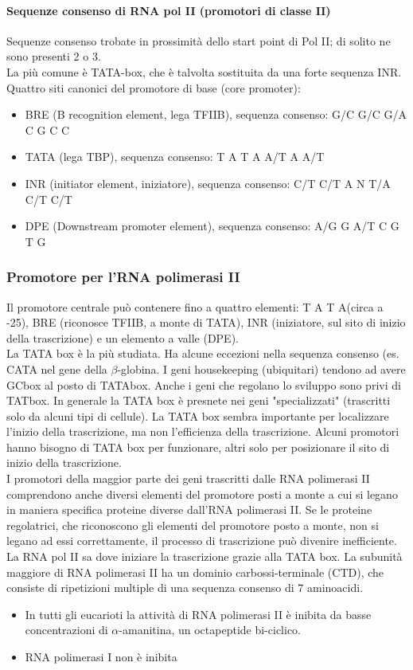 \documentclass{article}
\begin{document}
\paragraph{Sequenze consenso di RNA pol II (promotori di classe II)}
Sequenze consenso trobate in prossimità dello start point di Pol II; di solito ne sono presenti 2 o 3.\\
La più comune è TATA-box, che è talvolta sostituita da una forte sequenza INR.\\
Quattro siti canonici del promotore di base (core promoter):
\begin{itemize}
    \item BRE (B recognition element, lega TFIIB), sequenza consenso: G/C G/C G/A C G C C 
    \item TATA (lega TBP), sequenza consenso: T A T A A/T A A/T
    \item INR (initiator element, iniziatore), sequenza consenso: C/T C/T A N T/A C/T C/T
    \item DPE (Downstream promoter element), sequenza consenso: A/G G A/T C G T G
\end{itemize}
\subsubsection{Promotore per l'RNA polimerasi II}
Il promotore centrale può contenere fino a quattro elementi: T A T A(circa a -25), BRE (riconosce TFIIB, a monte di TATA), INR (iniziatore, sul sito di inizio della trascrizione) e un elemento a valle (DPE).\\
La TATA box è la più studiata. Ha alcune eccezioni nella sequenza consenso (es. CATA nel gene della $\beta$-globina. I geni housekeeping (ubiquitari) tendono ad avere GCbox al posto di TATAbox. Anche i geni che regolano lo sviluppo sono privi di TATbox.
In generale la TATA box è presnete nei geni "specializzati" (trascritti solo da alcuni tipi di cellule). La TATA box sembra importante per localizzare l'inizio della trascrizione, ma non l'efficienza della trascrizione.
Alcuni promotori hanno bisogno di TATA box per funzionare, altri solo per posizionare il sito di inizio della trascrizione.\\
I promotori della maggior parte dei geni trascritti dalle RNA polimerasi II comprendono anche diversi elementi del promotore posti a monte a cui si legano in maniera specifica proteine diverse dall'RNA polimerasi II.
Se le proteine regolatrici, che riconoscono gli elementi del promotore posto a monte, non si legano ad essi correttamente, il processo di trascrizione può divenire inefficiente.\\
La RNA pol II sa dove iniziare la trascrizione grazie alla TATA box.
La subunità maggiore di RNA polimerasi II ha un dominio carbossi-terminale (CTD), che consiste di ripetizioni multiple di una sequenza consenso di 7 aminoacidi.
\begin{itemize}
    \item In tutti gli eucarioti la attività di RNA polimerasi II è inibita da basse concentrazioni di $\alpha$-amanitina, un octapeptide bi-ciclico.
    \item RNA polimerasi I non è inibita
\end{itemize}
\end{document}
